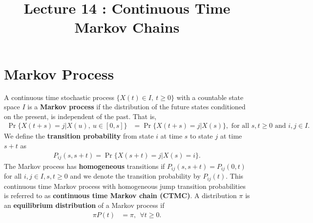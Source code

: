 \documentclass[a4paper,10pt,english]{article}
\title{Lecture 14 : Continuous Time Markov Chains}
\author{}
\begin{document}
\maketitle

\section{Markov Process}
A continuous time stochastic process $\{X(t) \in I, ~ t \geqslant 0\}$ with a countable state space $I$ is a \textbf{Markov process} if 
the distribution of the future states conditioned on the present, is independent of the past. 
That is,
\begin{align*}
\Pr\{X(t+s) = j |X(u),~ u \in [0,s]\} &= \Pr\{X(t+s) = j |X(s)\}, \text{ for all } s, t \geqslant 0 \text{ and } i, j \in I.
\end{align*}
We define the \textbf{transition probability} from state $i$ at time $s$ to state $j$ at time $s+t$ as 
\begin{align*}
P_{ij}(s, s+t) = \Pr\{X(s+t) = j | X(s) = i\}.
\end{align*}
The Markov process has \textbf{homogeneous} transitions if $P_{ij}(s,s+t) = P_{ij}(0,t)$ for all $i,j \in I, s,t \geqslant 0$ and we denote the transition probability by $P_{ij}(t)$. 
This continuous time Markov process with homogeneous jump transition probabilities is referred to as \textbf{continuous time Markov chain (CTMC)}. 
A distribution $\pi$ is an \textbf{equilibrium distribution} of a Markov process if
\begin{align*}
\pi P(t) &= \pi,~~ \forall t \geqslant 0. 
\end{align*}
\end{document}
